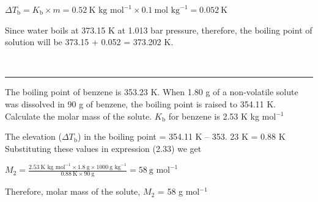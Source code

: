 \documentclass[11pt,a4paper]{article}
\begin{document}
\begin{tcolorbox}[enhanced,colback=white,colframe=gray!40,boxrule=0.8pt,toprule=0pt,sharp corners=north,arc=2mm,left=24pt,right=8pt,top=4pt,bottom=6pt,boxsep=0pt,drop fuzzy shadow=gray!40,overlay={\fill[SkyBlue] (frame.south west) rectangle ([xshift=14pt]frame.north west);}]
\noindent\hfill\begin{minipage}[t]{0.81\linewidth}
$\Delta T_\text{b} = K_\text{b} \times m = 0.52\ \text{K kg mol}^{-1} \times 0.1\ \text{mol kg}^{-1} = 0.052\ \text{K}$

Since water boils at 373.15 K at 1.013 bar pressure, therefore, the boiling point of solution will be 373.15 + 0.052 = 373.202 K.
\end{minipage}

\vspace{8pt}
\noindent\begin{minipage}[t]{0.17\linewidth}
\\[-3pt]
{\color{DeepSkyBlue3}\rule{\linewidth}{0.8pt}}
\end{minipage}\hfill
\begin{minipage}[t]{0.81\linewidth}
The boiling point of benzene is 353.23 K. When 1.80 g of a non-volatile solute was dissolved in 90 g of benzene, the boiling point is raised to 354.11 K. Calculate the molar mass of the solute. $K_\text{b}$ for benzene is 2.53 K kg mol$^{-1}$
\end{minipage}

\vspace{6pt}
\noindent\begin{minipage}[t]{0.17\linewidth}
\end{minipage}\hfill
\begin{minipage}[t]{0.81\linewidth}
The elevation ($\Delta T_\text{b}$) in the boiling point = 354.11 K -- 353. 23 K = 0.88 K\\
Substituting these values in expression (2.33) we get

\noindent$\displaystyle M_2 = \frac{2.53\ \text{K kg mol}^{-1} \times 1.8\ \text{g} \times 1000\ \text{g kg}^{-1}}{0.88\ \text{K} \times 90\ \text{g}} = 58\ \text{g mol}^{-1}$

Therefore, molar mass of the solute, $M_2$ = 58 g mol$^{-1}$
\end{minipage}
\end{tcolorbox}
\end{document}
